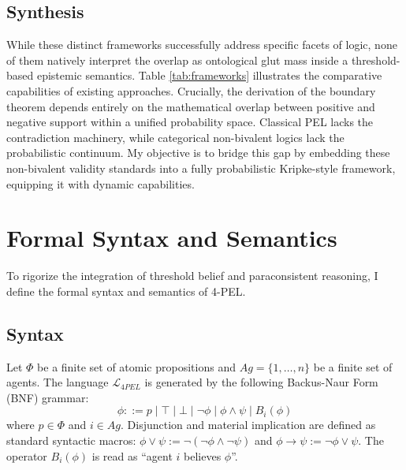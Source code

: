 \documentclass[11pt,a4paper]{article}
\begin{document}
\subsection{Synthesis}
While these distinct frameworks successfully address specific facets of logic, none of them natively interpret the overlap as ontological glut mass inside a threshold-based epistemic semantics. Table \ref{tab:frameworks} illustrates the comparative capabilities of existing approaches. Crucially, the derivation of the boundary theorem depends entirely on the mathematical overlap between positive and negative support within a unified probability space. Classical PEL lacks the contradiction machinery, while categorical non-bivalent logics lack the probabilistic continuum. My objective is to bridge this gap by embedding these non-bivalent validity standards into a fully probabilistic Kripke-style framework, equipping it with dynamic capabilities.

\begin{table}[ht]
\centering
{}
\caption{Comparative analysis of logical frameworks.}
\label{tab:frameworks}
\end{table}

\section{Formal Syntax and Semantics}
\label{sec:framework}

To rigorize the integration of threshold belief and paraconsistent reasoning, I define the formal syntax and semantics of 4-PEL.

\subsection{Syntax}
Let $\Phi$ be a finite set of atomic propositions and $Ag = \{1, \dots, n\}$ be a finite set of agents. The language $\mathcal{L}_{4PEL}$ is generated by the following Backus-Naur Form (BNF) grammar:
\begin{equation*}
    \phi ::= p \mid \top \mid \bot \mid \neg \phi \mid \phi \land \psi \mid B_i(\phi)
\end{equation*}
where $p \in \Phi$ and $i \in Ag$. Disjunction and material implication are defined as standard syntactic macros: $\phi \lor \psi := \neg(\neg \phi \land \neg \psi)$ and $\phi \to \psi := \neg \phi \lor \psi$. The operator $B_i(\phi)$ is read as ``agent $i$ believes $\phi$''.
\end{document}
